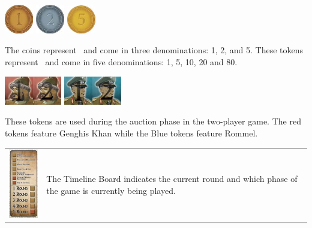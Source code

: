 \documentclass[10pt,twocolumn]{article}
\begin{document}
\compHead{\money}
\centerline{\includegraphics[width=1.25cm]{1Money}  \includegraphics[width=1.25cm]{2Money}  \includegraphics[width=1.25cm]{5Money}}
The coins represent \money\ and come in three denominations: 1, 2, and 5.
These tokens represent \victorypoints\ and come in five denominations: 1, 5, 10, 20 and 80.
\centerline{\includegraphics[height=1.25cm]{AT1}\includegraphics[height=1.25cm]{AT2}  \includegraphics[height=1.25cm]{AT3}\includegraphics[height=1.25cm]{AT4}}
These tokens are used during the auction phase in the two-player game. The red tokens feature Genghis Khan while the Blue tokens feature Rommel.
\begin{tabular}{p{2cm} p{5cm}}
	\vspace{0pt}
	\includegraphics[width=2cm]{TimelineBoard}
	&
	\vspace{0pt}
The Timeline Board indicates the current round and which phase of the game is currently being played.
\end{tabular}
\end{document}
